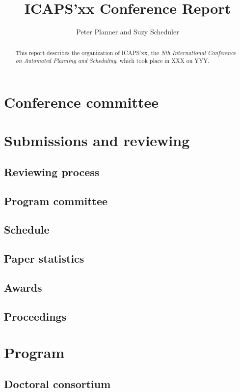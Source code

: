 \documentclass[11pt,a4paper]{article}
\begin{document}
\author{Peter Planner and Suzy Scheduler}
\title{ICAPS'xx Conference Report}

\maketitle

\begin{abstract}
This report describes the organization of ICAPS'xx,
the {\em Nth International Conference on Automated Planning and Scheduling},
which took place
in XXX
on YYY.
\end{abstract}

\parskip-2pt
\tableofcontents
\parskip4pt

\newpage

\section{Conference committee}

\section{Submissions and reviewing}
\subsection{Reviewing process}
\subsection{Program committee}
\subsection{Schedule}
\subsection{Paper statistics}\label{se:submissionstatistics}
\subsection{Awards}\label{se:bestpapers}
\subsection{Proceedings}

\section{Program}
\subsection{Doctoral consortium}
\end{document}
